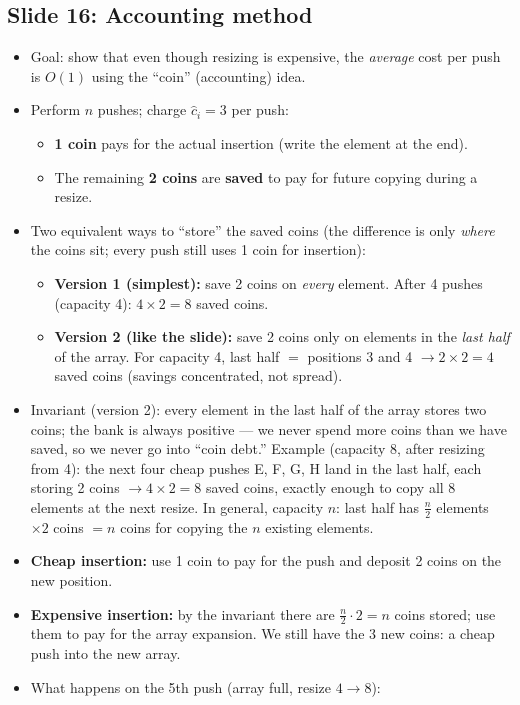 \documentclass[11pt]{article}
\newcommand{\slide}[2]{\subsection*{Slide #1: #2}}
\begin{document}
\slide{16}{Accounting method}
\begin{itemize}
  \item Goal: show that even though resizing is expensive, the \emph{average} cost per push is $O(1)$ using the ``coin'' (accounting) idea.
  \item Perform $n$ pushes; charge $\hat{c}_i = 3$ per push:
  \begin{itemize}
    \item \textbf{1 coin} pays for the actual insertion (write the element at the end).
    \item The remaining \textbf{2 coins} are \textbf{saved} to pay for future copying during a resize.
  \end{itemize}
  \item Two equivalent ways to ``store'' the saved coins (the difference is only \emph{where} the coins sit; every push still uses 1 coin for insertion):
  \begin{itemize}
    \item \textbf{Version 1 (simplest):} save 2 coins on \emph{every} element. After 4 pushes (capacity 4): $4 \times 2 = 8$ saved coins.
    \item \textbf{Version 2 (like the slide):} save 2 coins only on elements in the \emph{last half} of the array. For capacity 4, last half $=$ positions 3 and 4 $\to 2 \times 2 = 4$ saved coins (savings concentrated, not spread).
  \end{itemize}
  \item Invariant (version 2): every element in the last half of the array stores two coins; the bank is always positive --- we never spend more coins than we have saved, so we never go into ``coin debt.'' Example (capacity 8, after resizing from 4): the next four cheap pushes E, F, G, H land in the last half, each storing 2 coins $\to 4 \times 2 = 8$ saved coins, exactly enough to copy all 8 elements at the next resize. In general, capacity $n$: last half has $\tfrac n2$ elements $\times 2$ coins $= n$ coins for copying the $n$ existing elements.
  \item \textbf{Cheap insertion:} use 1 coin to pay for the push and deposit 2 coins on the new position.
  \item \textbf{Expensive insertion:} by the invariant there are $\tfrac{n}{2} \cdot 2 = n$ coins stored; use them to pay for the array expansion. We still have the 3 new coins: a cheap push into the new array.
  \item What happens on the 5th push (array full, resize $4 \to 8$):

\end{itemize}
\end{document}
